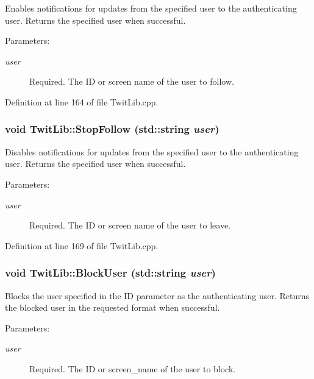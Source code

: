 Enables notifications for updates from the specified user to the authenticating user. Returns the specified user when successful. \begin{Desc}
\item[Parameters:]
\begin{description}
\item[{\em user}]Required. The ID or screen name of the user to follow. \end{description}
\end{Desc}


Definition at line 164 of file TwitLib.cpp.\hypertarget{classTwitLib_955be6b8ee764e6348e70a055c07c18d}{
\subsubsection{\setlength{\rightskip}{0pt plus 5cm}void TwitLib::StopFollow (std::string {\em user})}}
\label{classTwitLib_955be6b8ee764e6348e70a055c07c18d}


Disables notifications for updates from the specified user to the authenticating user. Returns the specified user when successful. \begin{Desc}
\item[Parameters:]
\begin{description}
\item[{\em user}]Required. The ID or screen name of the user to leave. \end{description}
\end{Desc}


Definition at line 169 of file TwitLib.cpp.\hypertarget{classTwitLib_bc66b89dd482ef5407a045e2f8f4709b}{
\subsubsection{\setlength{\rightskip}{0pt plus 5cm}void TwitLib::BlockUser (std::string {\em user})}}
\label{classTwitLib_bc66b89dd482ef5407a045e2f8f4709b}


Blocks the user specified in the ID parameter as the authenticating user. Returns the blocked user in the requested format when successful. \begin{Desc}
\item[Parameters:]
\begin{description}
\item[{\em user}]Required. The ID or screen\_\-name of the user to block. \end{description}
\end{Desc}


